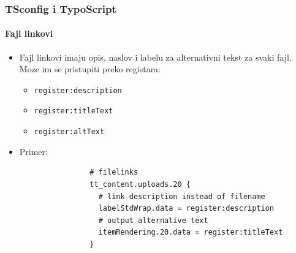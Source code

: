 \begin{frame}[fragile]
\begin{columns}[T]
	\end{columns}

\end{frame}


\begin{frame}[fragile]
	\frametitle{TSconfig i TypoScript}
	\framesubtitle{Fajl linkovi}

	\begin{itemize}
		\item Fajl linkovi imaju opis, naslov i labelu za alternativni tekst za svaki fajl.
			Moze im se pristupiti preko registara:

			\begin{itemize}
				\item \texttt{register:description}
				\item \texttt{register:titleText}
				\item \texttt{register:altText}
			\end{itemize}

		\item Primer:

			\begin{lstlisting}
				# filelinks
				tt_content.uploads.20 {
				  # link description instead of filename
				  labelStdWrap.data = register:description
				  # output alternative text
				  itemRendering.20.data = register:titleText
				}
			\end{lstlisting}

	\end{itemize}

\end{frame}


